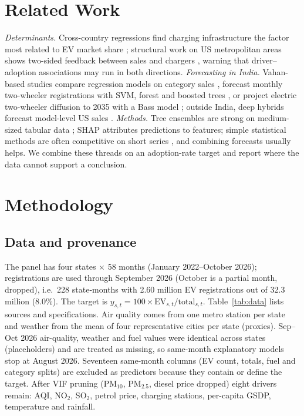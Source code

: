 \section{Related Work}
\emph{Determinants.} Cross-country regressions find charging infrastructure the factor most related to EV market share \cite{sierzchula}; structural work on US metropolitan areas shows two-sided feedback between sales and chargers \cite{li}, warning that driver--adoption associations may run in both directions. \emph{Forecasting in India.} Vahan-based studies compare regression models on category sales \cite{devarasan}, forecast monthly two-wheeler registrations with SVM, forest and boosted trees \cite{rohit}, or project electric two-wheeler diffusion to 2035 with a Bass model \cite{radhakrishnan}; outside India, deep hybrids forecast model-level US sales \cite{afandizadeh}. \emph{Methods.} Tree ensembles \cite{chen,ke} are strong on medium-sized tabular data \cite{grinsztajn}; SHAP \cite{lundberg} attributes predictions to features; simple statistical methods are often competitive on short series \cite{makridakis}, and combining forecasts usually helps. We combine these threads on an adoption-rate target and report where the data cannot support a conclusion.

\section{Methodology}
\subsection{Data and provenance}
The panel has four states $\times$ 58 months (January 2022--October 2026); registrations are used through September 2026 (October is a partial month, dropped), i.e.\ 228 state-months with 2.60 million EV registrations out of 32.3 million (8.0\%). The target is $y_{s,t}=100\times\text{EV}_{s,t}/\text{total}_{s,t}$. Table~\ref{tab:data} lists sources and specifications. Air quality comes from one metro station per state and weather from the mean of four representative cities per state (proxies). Sep--Oct 2026 air-quality, weather and fuel values were identical across states (placeholders) and are treated as missing, so same-month explanatory models stop at August 2026. Seventeen same-month columns (EV count, totals, fuel and category splits) are excluded as predictors because they contain or define the target. After VIF pruning (PM$_{10}$, PM$_{2.5}$, diesel price dropped) eight drivers remain: AQI, NO$_2$, SO$_2$, petrol price, charging stations, per-capita GSDP, temperature and rainfall.

